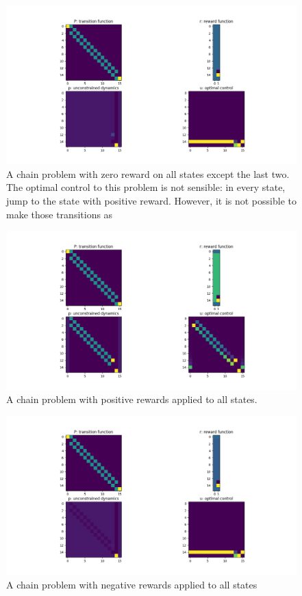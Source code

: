 \begin{figure}
\centering
\includegraphics[width=1\textwidth,height=0.35\textheight]{../../pictures/figures/chain-test-zero-rewards.png}
\caption{A chain problem with zero reward on all states except the last two.
The optimal control to this problem is not sensible: in every state, jump to the state with positive reward.
However, it is not possible to make those transitions as }
\end{figure}

\begin{figure}
\centering
\includegraphics[width=1\textwidth,height=0.35\textheight]{../../pictures/figures/chain-test-pos-rewards.png}
\caption{A chain problem with positive rewards applied to all states.}
\end{figure}

\begin{figure}
\centering
\includegraphics[width=1\textwidth,height=0.35\textheight]{../../pictures/figures/chain-test-neg-rewards.png}
\caption{A chain problem with negative rewards applied to all states}
\end{figure}

